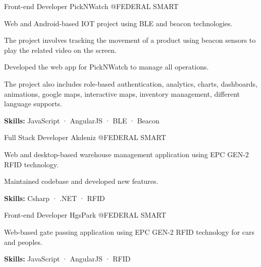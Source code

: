 \begin{cventries}
  \cventry
    {Front-end Developer} %
    {PickNWatch} %
    {@FEDERAL SMART} %
    {}
    {
      \begin{cvitems} %
        \item {Web and Android-based IOT project using BLE and beacon technologies.}
        \item {The project involves tracking the movement of a product using beacon sensors to play the related video on the screen.}
        \item {Developed the web app for PickNWatch to manage all operations.}
        \item {The project also includes role-based authentication, analytics, charts, dashboards, animations, google maps, interactive maps, inventory management, different language supports.}
        \item {\textbf {Skills:} JavaScript · AngularJS · BLE · Beacon}
      \end{cvitems}
    }

  \cventry
    {Full Stack Developer} %
    {Akdeniz} %
    {@FEDERAL SMART} %
    {}
    {
      \begin{cvitems} %
        \item {Web and desktop-based warehouse management application using EPC GEN-2 RFID technology.}
        \item {Maintained codebase and developed new features.}
        \item {\textbf {Skills:} Csharp · .NET · RFID}
      \end{cvitems}
    }

  \cventry
    {Front-end Developer} %
    {HgsPark} %
    {@FEDERAL SMART} %
    {}
    {
      \begin{cvitems} %
        \item {Web-based gate passing application using EPC GEN-2 RFID technology for cars and peoples.}
        \item {\textbf {Skills:} JavaScript · AngularJS · RFID}
      \end{cvitems}
    }

\end{cventries}
